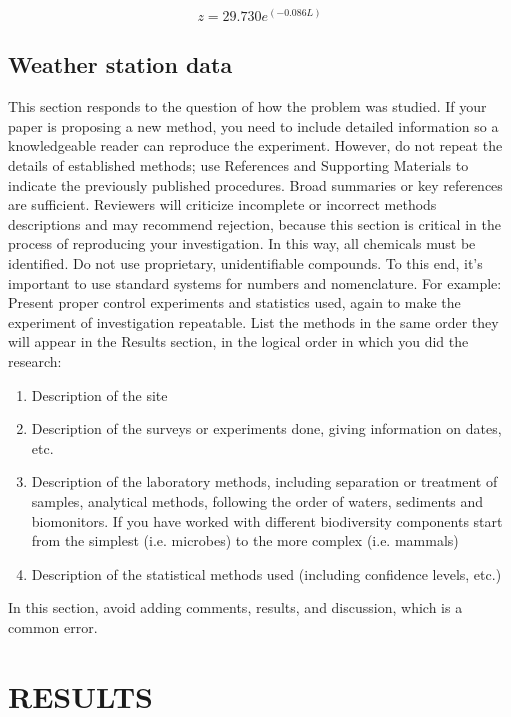 \documentclass[a4paper, 10pt, conference]{ieeeconf}      %
\begin{document}
 
\begin{equation}
\label{eq:lakedepth}
z = 29.730 e^{(-0.086 L)}
\end{equation}

\subsection{Weather station data}

This section responds to the question of how the problem was studied. If your paper is proposing a new method, you need to include detailed information so a knowledgeable reader can reproduce the experiment.
However, do not repeat the details of established methods; use References and Supporting Materials to indicate the previously published procedures. Broad summaries or key references are sufficient.
Reviewers will criticize incomplete or incorrect methods descriptions and may recommend rejection, because this section is critical in the process of reproducing your investigation. In this way, all chemicals must be identified. Do not use proprietary, unidentifiable compounds.
To this end, it's important to use standard systems for numbers and nomenclature. For example:
Present proper control experiments and statistics used, again to make the experiment of investigation repeatable.
List the methods in the same order they will appear in the Results section, in the logical order in which you did the research:
\begin{enumerate}
\item Description of the site
\item Description of the surveys or experiments done, giving information on dates, etc.
\item Description of the laboratory methods, including separation or treatment of samples,
analytical methods, following the order of waters, sediments and biomonitors. If you have worked with different biodiversity components start from the simplest (i.e. microbes) to the more complex (i.e. mammals)
\item Description of the statistical methods used (including confidence levels, etc.)
\end{enumerate}
In this section, avoid adding comments, results, and discussion, which is a common error.




\section{RESULTS}
\end{document}
